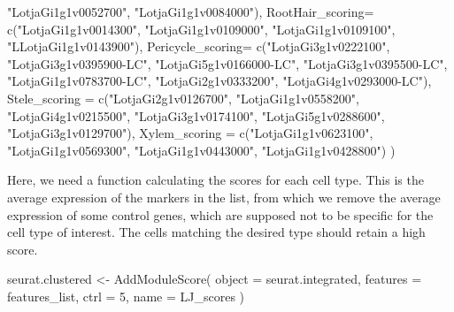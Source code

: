 \documentclass[
  letterpaper,
  DIV=11,
  numbers=noendperiod]{scrartcl}
\newenvironment{Shaded}{\begin{snugshade}}{\end{snugshade}}
\newcommand{\AttributeTok}[1]{\textcolor[rgb]{0.49,0.56,0.16}{#1}}
\newcommand{\DecValTok}[1]{\textcolor[rgb]{0.25,0.63,0.44}{#1}}
\newcommand{\FunctionTok}[1]{\textcolor[rgb]{0.02,0.16,0.49}{#1}}
\newcommand{\NormalTok}[1]{\textcolor[rgb]{0.00,0.44,0.13}{#1}}
\newcommand{\OtherTok}[1]{\textcolor[rgb]{0.00,0.44,0.13}{#1}}
\newcommand{\StringTok}[1]{\textcolor[rgb]{0.25,0.44,0.63}{#1}}
\begin{document}
\begin{Shaded}
\begin{Highlighting}[]
                           \StringTok{"LotjaGi1g1v0052700"}\NormalTok{,}
                           \StringTok{"LotjaGi1g1v0084000"}\NormalTok{),}
    \StringTok{\textquotesingle{}RootHair\_scoring\textquotesingle{}}\OtherTok{=} \FunctionTok{c}\NormalTok{(}\StringTok{"LotjaGi1g1v0014300"}\NormalTok{,}
                   \StringTok{"LotjaGi1g1v0109000"}\NormalTok{,}
                   \StringTok{"LotjaGi1g1v0109100"}\NormalTok{,}
                   \StringTok{"LLotjaGi1g1v0143900"}\NormalTok{),  }
    \StringTok{\textquotesingle{}Pericycle\_scoring\textquotesingle{}}\OtherTok{=} \FunctionTok{c}\NormalTok{(}\StringTok{"LotjaGi3g1v0222100"}\NormalTok{,}
                   \StringTok{"LotjaGi3g1v0395900{-}LC"}\NormalTok{,}
                   \StringTok{"LotjaGi5g1v0166000{-}LC"}\NormalTok{,}
                   \StringTok{"LotjaGi3g1v0395500{-}LC"}\NormalTok{,}
                   \StringTok{"LotjaGi1g1v0783700{-}LC"}\NormalTok{,}
                   \StringTok{"LotjaGi2g1v0333200"}\NormalTok{,}
                   \StringTok{"LotjaGi4g1v0293000{-}LC"}\NormalTok{),     }
    \StringTok{\textquotesingle{}Stele\_scoring\textquotesingle{}} \OtherTok{=} \FunctionTok{c}\NormalTok{(}\StringTok{"LotjaGi2g1v0126700"}\NormalTok{,}
                \StringTok{"LotjaGi1g1v0558200"}\NormalTok{,}
                \StringTok{"LotjaGi4g1v0215500"}\NormalTok{,}
                \StringTok{"LotjaGi3g1v0174100"}\NormalTok{,}
                \StringTok{"LotjaGi5g1v0288600"}\NormalTok{,}
                \StringTok{"LotjaGi3g1v0129700"}\NormalTok{),}
    \StringTok{\textquotesingle{}Xylem\_scoring\textquotesingle{}} \OtherTok{=} \FunctionTok{c}\NormalTok{(}\StringTok{"LotjaGi1g1v0623100"}\NormalTok{,}
                \StringTok{"LotjaGi1g1v0569300"}\NormalTok{,}
                \StringTok{"LotjaGi1g1v0443000"}\NormalTok{,}
                \StringTok{"LotjaGi1g1v0428800"}\NormalTok{)}
\NormalTok{    )}
\end{Highlighting}
\end{Shaded}

Here, we need a function calculating the scores for each cell type. This
is the average expression of the markers in the list, from which we
remove the average expression of some control genes, which are supposed
not to be specific for the cell type of interest. The cells matching the
desired type should retain a high score.

\begin{Shaded}
\begin{Highlighting}[]
\NormalTok{seurat.clustered }\OtherTok{\textless{}{-}} \FunctionTok{AddModuleScore}\NormalTok{(}
  \AttributeTok{object =}\NormalTok{ seurat.integrated,}
  \AttributeTok{features =}\NormalTok{ features\_list,}
  \AttributeTok{ctrl =} \DecValTok{5}\NormalTok{,}
  \AttributeTok{name =} \StringTok{\textquotesingle{}LJ\_scores\textquotesingle{}}
\NormalTok{)}
\end{Highlighting}
\end{Shaded}
\end{document}
